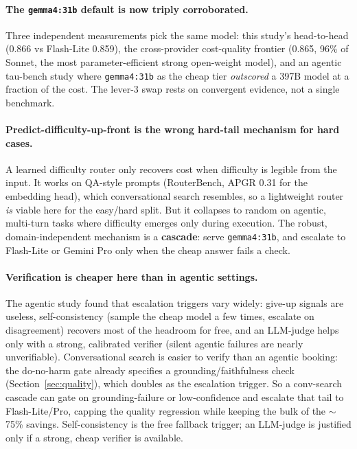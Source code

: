 \documentclass[11pt]{article}
\newcommand{\code}[1]{\texttt{\small #1}}
\begin{document}
\paragraph{The \code{gemma4:31b} default is now triply corroborated.} Three independent
measurements pick the same model: this study's head-to-head (0.866 vs Flash-Lite 0.859), the
cross-provider cost-quality frontier (0.865, 96\% of Sonnet, the most parameter-efficient strong
open-weight model), and an agentic tau-bench study where \code{gemma4:31b} as the cheap tier
\emph{outscored} a 397B model at a fraction of the cost. The lever-3 swap rests on convergent
evidence, not a single benchmark.

\paragraph{Predict-difficulty-up-front is the wrong hard-tail mechanism for hard cases.} A learned
difficulty router only recovers cost when difficulty is legible from the input. It works on
QA-style prompts (RouterBench, APGR 0.31 for the embedding head), which conversational search
resembles, so a lightweight router \emph{is} viable here for the easy/hard split. But it
collapses to random on agentic, multi-turn tasks where difficulty emerges only during execution.
The robust, domain-independent mechanism is a \textbf{cascade}: serve \code{gemma4:31b}, and
escalate to Flash-Lite or Gemini Pro only when the cheap answer fails a check.

\paragraph{Verification is cheaper here than in agentic settings.} The agentic study found that
escalation triggers vary widely: give-up signals are useless, self-consistency (sample the cheap
model a few times, escalate on disagreement) recovers most of the headroom for free, and an
LLM-judge helps only with a strong, calibrated verifier (silent agentic failures are nearly
unverifiable). Conversational search is easier to verify than an agentic booking: the do-no-harm
gate already specifies a grounding/faithfulness check (Section~\ref{sec:quality}), which doubles
as the escalation trigger. So a conv-search cascade can gate on grounding-failure or
low-confidence and escalate that tail to Flash-Lite/Pro, capping the quality regression while
keeping the bulk of the $\sim$75\% savings. Self-consistency is the free fallback trigger; an
LLM-judge is justified only if a strong, cheap verifier is available.
\end{document}
